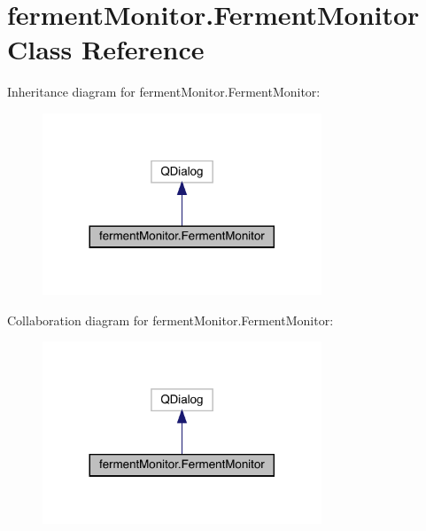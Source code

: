 \hypertarget{classferment_monitor_1_1_ferment_monitor}{}\section{ferment\+Monitor.\+Ferment\+Monitor Class Reference}
\label{classferment_monitor_1_1_ferment_monitor}


Inheritance diagram for ferment\+Monitor.\+Ferment\+Monitor\+:\nopagebreak
\begin{figure}[H]
\begin{center}
\leavevmode
\includegraphics[width=236pt]{classferment_monitor_1_1_ferment_monitor__inherit__graph}
\end{center}
\end{figure}


Collaboration diagram for ferment\+Monitor.\+Ferment\+Monitor\+:\nopagebreak
\begin{figure}[H]
\begin{center}
\leavevmode
\includegraphics[width=236pt]{classferment_monitor_1_1_ferment_monitor__coll__graph}
\end{center}
\end{figure}
